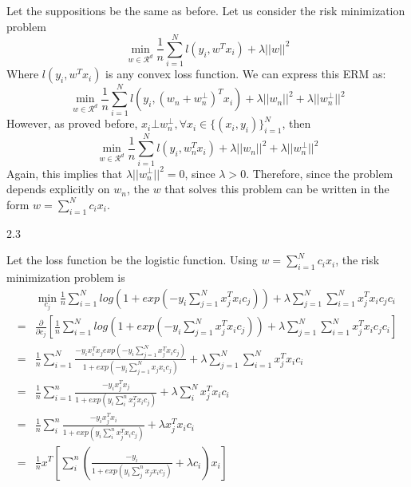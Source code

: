 \documentclass[12pt]{report}
\begin{document}
Let the suppositions be the same as before. Let us consider the risk minimization problem
$$ \min_{w \in \mathcal{R}^{d}} \frac{1}{n} \sum^{N}_{i=1} l(y_{i}, w^{T}x_{i}) + \lambda \lvert \lvert w \rvert \rvert^{2} $$
Where $l(y_{i}, w^{T}x_{i})$ is any convex loss function. We can express this ERM as:
$$\min_{w \in \mathcal{R}^{d}} \frac{1}{n} \sum^{N}_{i=1} l(y_{i}, (w_{n}+w^{\bot}_{n})^{T}x_{i}) + \lambda \lvert \lvert w_{n} \rvert \rvert^{2} + \lambda \lvert \lvert w_{n}^{\bot} \rvert \rvert^{2} $$
However, as proved before, $x_{i} \bot w_{n}^{\bot}, \forall x_{i} \in \{(x_{i}, y_{i})\}_{i=1}^{N}$, then
$$\min_{w \in \mathcal{R}^{d}} \frac{1}{n} \sum^{N}_{i=1} l(y_{i}, w_{n}^{T}x_{i}) + \lambda \lvert \lvert w_{n} \rvert \rvert^{2} + \lambda \lvert \lvert w_{n}^{\bot} \rvert \rvert^{2} $$
Again, this implies that $\lambda \lvert \lvert w_{n}^{\bot} \rvert \rvert^{2} = 0$, since $\lambda > 0$.
Therefore, since the problem depends explicitly on $w_{n}$, the $w$ that solves this problem can be written in the form $w = \sum^{N}_{i=1} c_{i}x_{i}$.

2.3

Let the loss function be the logistic function. Using $w = \sum^{N}_{i=1} c_{i}x_{i}$, the risk minimization problem is
\begin{equation}
  \begin{aligned}
    & \min_{c_{j}} \frac{1}{n} \sum^{N}_{i=1}log(1 + exp(-y_{i} \sum^{N}_{j=1}x_{j}^{T}x_{i}c_{j})) + \lambda \sum^{N}_{j=1} \sum^{N}_{i=1} x_{j}^{T}x_{i}c_{j}c_{i} \\
    = & \frac{\partial}{\partial c_{j}} \left[ \frac{1}{n} \sum^{N}_{i=1} log(1 + exp(-y_{i} \sum^{N}_{j=1} x^{T}_{j}x_{i}c_{j})) + \lambda \sum^{N}_{j=1} \sum^{N}_{i=1} x_{j}^{T}x_{i}c_{j}c_{i} \right] \\
    = & \frac{1}{n} \sum^{N}_{i=1} \frac{-y_{i}x^{T}_{i}x_{j}exp(-y_{i} \sum^{N}_{j=1}x_{j}^{T}x_{i}c_{j})}{1+exp(-y_{i}\sum^{N}_{j=1}x_{j}x_{i}c_{j})} + \lambda \sum^{N}_{j=1} \sum^{N}_{i=1} x_{j}^{T}x_{i}c_{i} \\
    = & \frac{1}{n} \sum^{n}_{i=1} \frac{-y_{i}x_{j}^{T}x_{j}}{1 + exp(y_{i}\sum^{n}_{i} x_{j}^{T}x_{i}c_{j})} + \lambda \sum^{N}_{i}x_{j}^{T}x_{i}c_{i} \\
    = & \frac{1}{n} \sum^{n}_{i} \frac{-y_{i} x_{j}^{T} x_{i}}{1 + exp(y_{i} \sum^{n}_{i}x_{j}^{T}x_{i}c_{j})} + \lambda x_{j}^{T}x_{i}c_{i} \\
    = & \frac{1}{n} x^{T}\left[ \sum^{n}_{i} \left( \frac{-y_{i}}{1+exp(y_{i}\sum^{n}_{j}x_{j}x_{i}c_{j})} + \lambda c_{i} \right)x_{i}\right]
  \end{aligned}
\end{equation}
\end{document}
